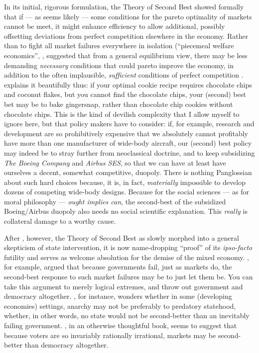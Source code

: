 In its initial, rigorous formulation, the Theory of Second Best showed formally that if --- as seems likely --- some conditions for the pareto optimality of markets cannot be meet, it might enhance efficiency to allow additional, possibly offsetting deviations from perfect competition elsewhere in the economy.
Rather than to fight all market failures everywhere in isolation (``piecemeal welfare economics'', \citeyearpar[11]{Lancaster1956}, \citeauthor{Lancaster1956} suggested that from a general equilibrium view, there may be less demanding \emph{necessary} conditions that could pareto improve the economy, in addition to the often implausible, \emph{sufficient} conditions of perfect competition \citeyearpar[17]{Lancaster1956}.
\cite{TheEconomist2007} explains it beautifully thus:
if your optimal cookie recipe requires chocolate chips and coconut flakes, but you cannot find the chocolate chips, your (second) best bet may be to bake gingersnap, rather than chocolate chip cookies without chocolate chips.
This is the kind of devilish complexity that I allow myself to ignore here, but that policy makers have to consider:
if, for example, research and development are so prohibitively expensive that we absolutely cannot profitably have more than one manufacturer of wide-body aircraft, our (second) best policy may indeed be to stray further from neoclassical doctrine, and to keep subsidizing \emph{The Boeing Company} and \emph{Airbus SES}, so that we can have at least have ourselves a decent, somewhat competitive, duopoly.
There is nothing Panglossian about such hard choices because, it is, in fact, \emph{materially} impossible to develop dozens of competing wide-body designs.
Because for the social sciences --- as for moral philosophy --- \emph{ought implies can}, the second-best of the subsidized Boeing/Airbus duopoly also needs no social scientific explanation.
This \emph{really} is collateral damage to a worthy cause.

After \citeyear{Lancaster1956}, however, the Theory of Second Best as slowly morphed into a general skepticism of state intervention, it is now name-dropping ``proof'' of its \emph{ipso-facto} futility and serves as welcome absolution for the demise of the mixed economy.
\citet{Wolf1987,Wolf1979}, for example, argued that because governments fail, just as markets do, the second-best response to such market failures may be to just let them be.
You can take this argument to merely logical extremes, and throw out government and democracy altogether.
\cite{Leeson2009}, for instance, wonders whether in some (developing economies) settings, anarchy may not be preferably to predatory statehood, whether, in other words, no state would not be second-better than an inevitably failing government.
\cite{Caplan2007}, in an otherwise thoughtful book, seems to suggest that because voters are so invariably rationally irrational, markets may be second-better than democracy altogether.

